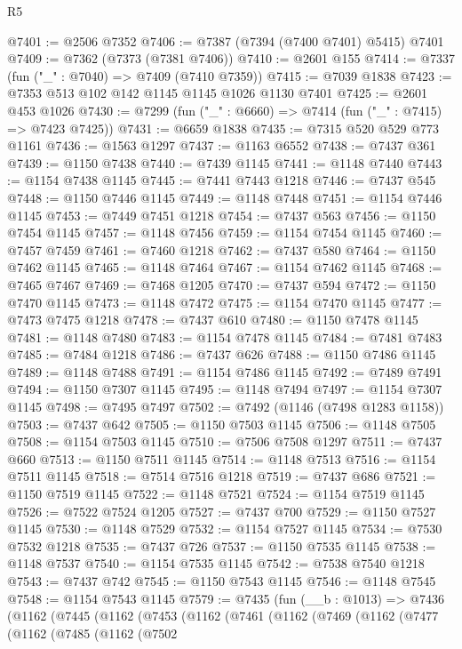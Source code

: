 \begin{lexlean}{R5}
\begin{coremodule}
@7401 := @2506 @7352
@7406 := @7387 (@7394 (@7400 @7401) @5415) @7401
@7409 := @7362 (@7373 (@7381 @7406))
@7410 := @2601 @155
@7414 := @7337 (fun ("_" : @7040) => @7409 (@7410 @7359))
@7415 := @7039 @1838
@7423 := @7353 @513 @102 @142 @1145 @1145 @1026 @1130 @7401
@7425 := @2601 @453 @1026
@7430 := @7299 (fun ("_" : @6660) => @7414 (fun ("_" : @7415) => @7423 @7425))
@7431 := @6659 @1838
@7435 := @7315 @520 @529 @773 @1161
@7436 := @1563 @1297
@7437 := @1163 @6552
@7438 := @7437 @361
@7439 := @1150 @7438
@7440 := @7439 @1145
@7441 := @1148 @7440
@7443 := @1154 @7438 @1145
@7445 := @7441 @7443 @1218
@7446 := @7437 @545
@7448 := @1150 @7446 @1145
@7449 := @1148 @7448
@7451 := @1154 @7446 @1145
@7453 := @7449 @7451 @1218
@7454 := @7437 @563
@7456 := @1150 @7454 @1145
@7457 := @1148 @7456
@7459 := @1154 @7454 @1145
@7460 := @7457 @7459
@7461 := @7460 @1218
@7462 := @7437 @580
@7464 := @1150 @7462 @1145
@7465 := @1148 @7464
@7467 := @1154 @7462 @1145
@7468 := @7465 @7467
@7469 := @7468 @1205
@7470 := @7437 @594
@7472 := @1150 @7470 @1145
@7473 := @1148 @7472
@7475 := @1154 @7470 @1145
@7477 := @7473 @7475 @1218
@7478 := @7437 @610
@7480 := @1150 @7478 @1145
@7481 := @1148 @7480
@7483 := @1154 @7478 @1145
@7484 := @7481 @7483
@7485 := @7484 @1218
@7486 := @7437 @626
@7488 := @1150 @7486 @1145
@7489 := @1148 @7488
@7491 := @1154 @7486 @1145
@7492 := @7489 @7491
@7494 := @1150 @7307 @1145
@7495 := @1148 @7494
@7497 := @1154 @7307 @1145
@7498 := @7495 @7497
@7502 := @7492 (@1146 (@7498 @1283 @1158))
@7503 := @7437 @642
@7505 := @1150 @7503 @1145
@7506 := @1148 @7505
@7508 := @1154 @7503 @1145
@7510 := @7506 @7508 @1297
@7511 := @7437 @660
@7513 := @1150 @7511 @1145
@7514 := @1148 @7513
@7516 := @1154 @7511 @1145
@7518 := @7514 @7516 @1218
@7519 := @7437 @686
@7521 := @1150 @7519 @1145
@7522 := @1148 @7521
@7524 := @1154 @7519 @1145
@7526 := @7522 @7524 @1205
@7527 := @7437 @700
@7529 := @1150 @7527 @1145
@7530 := @1148 @7529
@7532 := @1154 @7527 @1145
@7534 := @7530 @7532 @1218
@7535 := @7437 @726
@7537 := @1150 @7535 @1145
@7538 := @1148 @7537
@7540 := @1154 @7535 @1145
@7542 := @7538 @7540 @1218
@7543 := @7437 @742
@7545 := @1150 @7543 @1145
@7546 := @1148 @7545
@7548 := @1154 @7543 @1145
@7579 := @7435
    (fun (__b : @1013) =>
    @7436
      (@1162
        (@7445
          (@1162
            (@7453
              (@1162
                (@7461
                  (@1162
                    (@7469
                      (@1162
                        (@7477
                          (@1162
                            (@7485
                              (@1162
                                (@7502

\end{coremodule}
\end{lexlean}
